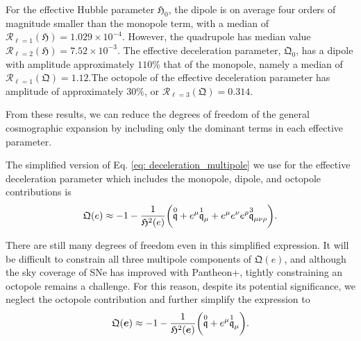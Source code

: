 \documentclass[fleqn,usenatbib]{mnras}
\begin{document}
{For the effective Hubble parameter $\mathfrak{H}_0$, %
the dipole is %
on average {four} orders of magnitude smaller than the {monopole} term, with a median of { $\mathcal{R}_{\ell=1}(\mathfrak{H}) =1.029\times 10^{-4} $}.
However, 
{the} quadrupole %
{has} median value {$\mathcal{R}_{\ell=2}(\mathfrak{H}) = 7.52 \times 10^{-3}$. }
The effective deceleration parameter, %
$\mathfrak{Q}_0$, %
has a dipole {with amplitude} approximately {$110\%$ }{that} %
of the monopole, {namely a median of} {$\mathcal{R}_{\ell=1}(\mathfrak{Q}) = 1.12$}.{The} %
octopole of {the effective deceleration parameter has amplitude of approximately} %
{$30\%$, {or} $\mathcal{R}_{\ell=3}(\mathfrak{Q}) =0.314$. }

From these results, we {can} reduce the degrees of freedom of %
the general cosmographic expansion %
by including only the dominant terms in each effective parameter.

The simplified version of Eq. \eqref{eq: deceleration_multipole} we use for the effective deceleration parameter which includes the monopole, dipole, and octopole contributions is%
\begin{equation}
    \label{eq: approx q}
    \mathfrak{Q}(e) \approx -1 - \frac{1}{\mathfrak{H}^2(e)} \bigg( \overset{0}{\mathfrak{q}}+e^\mu \overset{1}{\mathfrak{q}}_\mu + 
    e^\mu e^\nu e^\rho \overset{3}{\mathfrak{q}}_{\mu\nu\rho} \bigg{)}.
\end{equation}

There are still
many degrees of freedom even in this simplified expression. %
It will be difficult to constrain all {three multipole} components of $\mathfrak{Q}(e)$, and although the sky coverage of SNe has %
improved with Pantheon+, tightly constraining an octopole remains a challenge. 
For this reason, %
despite its potential significance, %
we neglect the octopole contribution and further simplify the expression to 
\begin{equation}
    \label{eq: multipole_decel}
    \mathfrak{Q}(\boldsymbol{e}) \approx -1 - \frac{1}{\mathfrak{H}^2(\boldsymbol{e})} \bigg( \overset{0}{\mathfrak{q}}+e^\mu \overset{1}{\mathfrak{q}}_\mu  \bigg{)}.
\end{equation}


}
\end{document}
